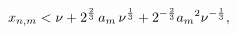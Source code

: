 \[x_{n,m}<\nu+2^{\frac{2}{3}}\mathop{a_{m}\/}\nolimits\nu^{\frac{1}{3}}+2^{-%
\frac{2}{3}}{\mathop{a_{m}\/}\nolimits^{2}}\nu^{-\frac{1}{3}},\]